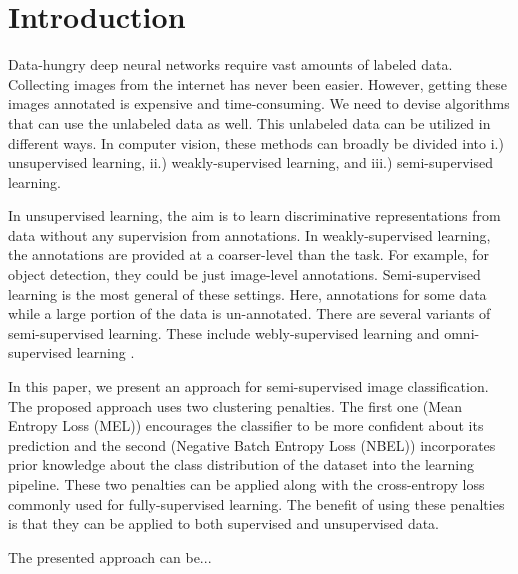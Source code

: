 \section{Introduction}

Data-hungry deep neural networks require vast amounts of labeled data. Collecting images from the
internet has never been easier. However, getting these images annotated is expensive and
time-consuming. We need to devise algorithms that can use the unlabeled data as well. This unlabeled
data can be utilized in different ways. In computer vision, these methods can broadly be divided
into i.) unsupervised learning, ii.) weakly-supervised learning, and iii.) semi-supervised learning.

In unsupervised learning, the aim is to learn discriminative representations from data without any
supervision from annotations. In weakly-supervised learning, the annotations are provided at a
coarser-level than the task. For example, for object detection, they could be just image-level
annotations. Semi-supervised learning is the most general of these settings. Here, annotations for
some data while a large portion of the data is un-annotated. There are several variants of
semi-supervised learning. These include webly-supervised learning \cite{} and omni-supervised
learning \cite{}. 

In this paper, we present an approach for semi-supervised image classification. The proposed
approach uses two clustering penalties. The first one (Mean Entropy Loss (MEL)) encourages the
classifier to be more confident about its prediction and the second (Negative Batch Entropy Loss
(NBEL)) incorporates prior knowledge about the class distribution of the dataset into the learning
pipeline. These two penalties can be applied along with the cross-entropy loss commonly used for
fully-supervised learning. The benefit of using these penalties is that they can be applied to both
supervised and unsupervised data. 

The presented approach can be... 




%
%
